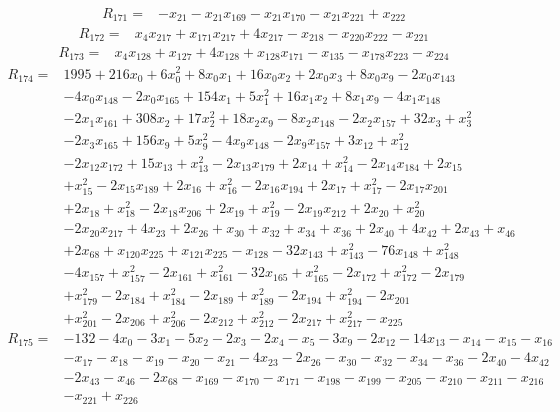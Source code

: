 \[\begin{aligned}R_{171}={}&-x_{21}-x_{21}x_{169}-x_{21}x_{170}-x_{21}x_{221}+x_{222}
\end{aligned}\]
\[\begin{aligned}R_{172}={}&x_{4}x_{217}+x_{171}x_{217}+4x_{217}-x_{218}-x_{220}x_{222}-x_{221}
\end{aligned}\]
\[\begin{aligned}R_{173}={}&x_{4}x_{128}+x_{127}+4x_{128}+x_{128}x_{171}-x_{135}-x_{178}x_{223}-x_{224}
\end{aligned}\]
\[\begin{aligned}R_{174}={}&1995+216x_{0}+6x_{0}^{2}+8x_{0}x_{1}+16x_{0}x_{2}+2x_{0}x_{3}+8x_{0}x_{9}-2x_{0}x_{143}
\\&-4x_{0}x_{148}-2x_{0}x_{165}+154x_{1}+5x_{1}^{2}+16x_{1}x_{2}+8x_{1}x_{9}-4x_{1}x_{148}
\\&-2x_{1}x_{161}+308x_{2}+17x_{2}^{2}+18x_{2}x_{9}-8x_{2}x_{148}-2x_{2}x_{157}+32x_{3}+x_{3}^{2}
\\&-2x_{3}x_{165}+156x_{9}+5x_{9}^{2}-4x_{9}x_{148}-2x_{9}x_{157}+3x_{12}+x_{12}^{2}
\\&-2x_{12}x_{172}+15x_{13}+x_{13}^{2}-2x_{13}x_{179}+2x_{14}+x_{14}^{2}-2x_{14}x_{184}+2x_{15}
\\&+x_{15}^{2}-2x_{15}x_{189}+2x_{16}+x_{16}^{2}-2x_{16}x_{194}+2x_{17}+x_{17}^{2}-2x_{17}x_{201}
\\&+2x_{18}+x_{18}^{2}-2x_{18}x_{206}+2x_{19}+x_{19}^{2}-2x_{19}x_{212}+2x_{20}+x_{20}^{2}
\\&-2x_{20}x_{217}+4x_{23}+2x_{26}+x_{30}+x_{32}+x_{34}+x_{36}+2x_{40}+4x_{42}+2x_{43}+x_{46}
\\&+2x_{68}+x_{120}x_{225}+x_{121}x_{225}-x_{128}-32x_{143}+x_{143}^{2}-76x_{148}+x_{148}^{2}
\\&-4x_{157}+x_{157}^{2}-2x_{161}+x_{161}^{2}-32x_{165}+x_{165}^{2}-2x_{172}+x_{172}^{2}-2x_{179}
\\&+x_{179}^{2}-2x_{184}+x_{184}^{2}-2x_{189}+x_{189}^{2}-2x_{194}+x_{194}^{2}-2x_{201}
\\&+x_{201}^{2}-2x_{206}+x_{206}^{2}-2x_{212}+x_{212}^{2}-2x_{217}+x_{217}^{2}-x_{225}
\end{aligned}\]
\[\begin{aligned}R_{175}={}&-132-4x_{0}-3x_{1}-5x_{2}-2x_{3}-2x_{4}-x_{5}-3x_{9}-2x_{12}-14x_{13}-x_{14}-x_{15}-x_{16}
\\&-x_{17}-x_{18}-x_{19}-x_{20}-x_{21}-4x_{23}-2x_{26}-x_{30}-x_{32}-x_{34}-x_{36}-2x_{40}-4x_{42}
\\&-2x_{43}-x_{46}-2x_{68}-x_{169}-x_{170}-x_{171}-x_{198}-x_{199}-x_{205}-x_{210}-x_{211}-x_{216}
\\&-x_{221}+x_{226}
\end{aligned}\]
\endgroup
